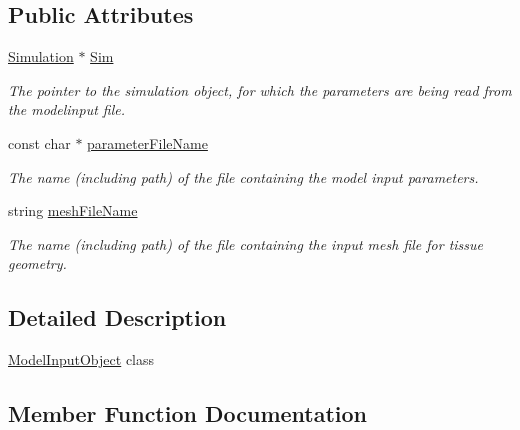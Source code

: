 \subsection*{Public Attributes}
\begin{DoxyCompactItemize}
\item 
\hypertarget{classModelInputObject_a0c5fb50d9d705bc9a9b4fafeebd1cadc}{}\hyperlink{classSimulation}{Simulation} $\ast$ \hyperlink{classModelInputObject_a0c5fb50d9d705bc9a9b4fafeebd1cadc}{Sim}\label{classModelInputObject_a0c5fb50d9d705bc9a9b4fafeebd1cadc}

\begin{DoxyCompactList}\small\item\em The pointer to the simulation object, for which the parameters are being read from the modelinput file. \end{DoxyCompactList}\item 
\hypertarget{classModelInputObject_a32fadb000159d03f6c5901ce3167ada8}{}const char $\ast$ \hyperlink{classModelInputObject_a32fadb000159d03f6c5901ce3167ada8}{parameter\+File\+Name}\label{classModelInputObject_a32fadb000159d03f6c5901ce3167ada8}

\begin{DoxyCompactList}\small\item\em The name (including path) of the file containing the model input parameters. \end{DoxyCompactList}\item 
\hypertarget{classModelInputObject_a2621e76abbd05573aea2d5471a589405}{}string \hyperlink{classModelInputObject_a2621e76abbd05573aea2d5471a589405}{mesh\+File\+Name}\label{classModelInputObject_a2621e76abbd05573aea2d5471a589405}

\begin{DoxyCompactList}\small\item\em The name (including path) of the file containing the input mesh file for tissue geometry. \end{DoxyCompactList}\end{DoxyCompactItemize}


\subsection{Detailed Description}
\hyperlink{classModelInputObject}{Model\+Input\+Object} class 

\subsection{Member Function Documentation}
\hypertarget{classModelInputObject_a9741685527f446bd2bf66455c5b01d0c}{}
